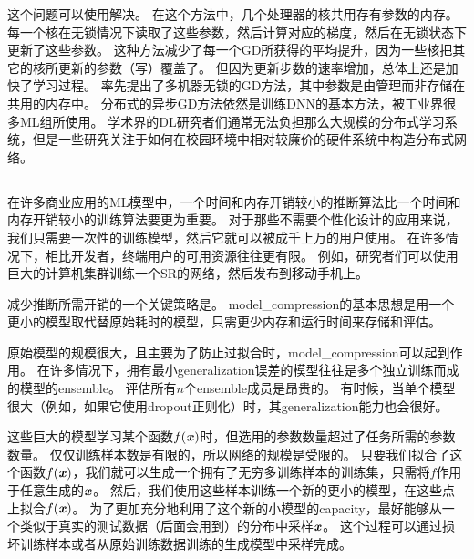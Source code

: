这个问题可以使用\citep{Bengio+Bengio96,Recht-et-al-NIPS2011}解决。
在这个方法中，几个处理器的核共用存有参数的内存。
每一个核在无锁情况下读取了这些参数，然后计算对应的梯度，然后在无锁状态下更新了这些参数。
这种方法减少了每一个\gls{GD}所获得的平均提升，因为一些核把其它的核所更新的参数（写）覆盖了。
但因为更新步数的速率增加，总体上还是加快了学习过程。
\citet{Dean-et-al-NIPS2012}率先提出了多机器无锁的\gls{GD}方法，其中参数是由管理而非存储在共用的内存中。
分布式的异步\gls{GD}方法依然是训练\gls{DNN}的基本方法，被工业界很多\gls{ML}组所使用\citep{chilimbi2014project,Wu-et-al-arXiv2015}。
学术界的\gls{DL}研究者们通常无法负担那么大规模的分布式学习系统，但是一些研究关注于如何在校园环境中相对较廉价的硬件系统中构造分布式网络\citep{icml2013_coates13}。


\subsection{}
\label{sec:model_compression}

在许多商业应用的\gls{ML}模型中，一个时间和内存开销较小的推断算法比一个时间和内存开销较小的训练算法要更为重要。
对于那些不需要个性化设计的应用来说，我们只需要一次性的训练模型，然后它就可以被成千上万的用户使用。
在许多情况下，相比开发者，终端用户的可用资源往往更有限。
例如，研究者们可以使用巨大的计算机集群训练一个\gls{SR}的网络，然后发布到移动手机上。


减少推断所需开销的一个关键策略是\citep{bucilua2006model}。
\gls{model_compression}的基本思想是用一个更小的模型取代替原始耗时的模型，只需更少内存和运行时间来存储和评估。



原始模型的规模很大，且主要为了防止过拟合时，\gls{model_compression}可以起到作用。
在许多情况下，拥有最小\gls{generalization}误差的模型往往是多个独立训练而成的模型的\gls{ensemble}。
评估所有$n$个\gls{ensemble}成员是昂贵的。
有时候，当单个模型很大（例如，如果它使用\gls{dropout}正则化）时，其\gls{generalization}能力也会很好。

这些巨大的模型学习某个函数$f(\boldsymbol{\mathit{x}})$时，但选用的参数数量超过了任务所需的参数数量。
仅仅训练样本数是有限的，所以网络的规模是受限的。
只要我们拟合了这个函数$f(\boldsymbol{\mathit{x}})$，我们就可以生成一个拥有了无穷多训练样本的训练集，只需将$f$作用于任意生成的$\boldsymbol{\mathit{x}}$。
然后，我们使用这些样本训练一个新的更小的模型，在这些点上拟合$f(\boldsymbol{\mathit{x}})$。
为了更加充分地利用了这个新的小模型的\gls{capacity}，最好能够从一个类似于真实的测试数据（后面会用到）的分布中采样$\boldsymbol{\mathit{x}}$。
这个过程可以通过损坏训练样本或者从原始训练数据训练的生成模型中采样完成。

